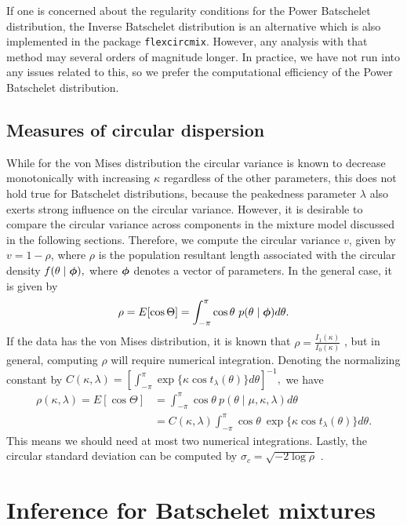 If one is concerned about the regularity conditions for the Power Batschelet distribution, the Inverse Batschelet distribution is an alternative which is also implemented in the package \texttt{flexcircmix}. However, any analysis with that method may several orders of magnitude longer. In practice, we have not run into any issues related to this, so we prefer the computational efficiency of the Power Batschelet distribution.

\subsection{Measures of circular dispersion}
\label{sub:csd}

While for the von Mises distribution the circular variance is known to decrease monotonically with increasing \(\kappa\) regardless of the other parameters, this does not hold true for Batschelet distributions, because the peakedness parameter \(\lambda\) also exerts strong influence on the circular variance. However, it is desirable to compare the circular variance across components in the mixture model discussed in the following sections. Therefore, we compute the circular variance $v$, given by \(v = 1 - \rho\), where \(\rho\) is the population resultant length associated with the circular density \(f(\theta \mid \boldsymbol{\phi}),\)  where \(\boldsymbol{\phi}\) denotes a vector of parameters. In the general case, it is given by
\begin{equation}
  \rho = E[\cos\Theta] = \int_{-\pi}^\pi \cos\theta ~ p(\theta \mid \boldsymbol{\phi}) d\theta.
\end{equation}
If the data has the von Mises distribution, it is known that \(\rho =  \frac{I_1(\kappa)}{I_0(\kappa)}\) \citep{mardia2009directional}, but in general, computing \(\rho\) will require numerical integration. Denoting the normalizing constant by \(C(\kappa, \lambda) = \left[\int_{-\pi}^\pi \exp\{\kappa \cos t_\lambda(\theta) \} d\theta \right]^{-1} ,\) we have
\begin{align}
\rho(\kappa, \lambda) = E[\cos\Theta] &= \int_{-\pi}^\pi \cos\theta ~ p(\theta \mid \mu, \kappa, \lambda) d\theta  \\
&= C(\kappa, \lambda) \int_{-\pi}^\pi \cos\theta ~  \exp\{\kappa \cos t_\lambda(\theta) \} d\theta.
\end{align}
This means we should need at most two numerical integrations. Lastly, the circular standard deviation can be computed by \(\sigma_c = \sqrt{-2\log\rho}\) \citep{fisher1995statistical}.


\section{Inference for Batschelet mixtures}
\label{sec:infer}

